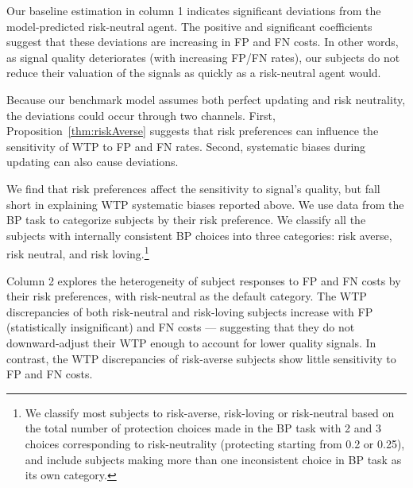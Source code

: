 \documentclass[12pt,a4paper]{article}
\begin{document}
Our baseline estimation in column 1 indicates significant deviations from the model-predicted risk-neutral agent. The positive and significant coefficients suggest that these deviations are increasing in FP and FN costs. In other words, as signal quality deteriorates (with increasing FP/FN rates), our subjects do not reduce their valuation of the signals as quickly as a risk-neutral agent would.

Because our benchmark model assumes both perfect updating and risk neutrality, the deviations could occur through two channels. First, Proposition~\ref{thm:riskAverse} suggests that risk preferences can influence the sensitivity of WTP to FP and FN rates. Second, systematic biases during updating can also cause deviations. 

We find that risk preferences affect the sensitivity to signal's quality, but fall short in explaining WTP systematic biases reported above. We use data from the BP task to categorize subjects by their risk preference. We classify all the subjects with internally consistent BP choices into three categories: risk averse, risk neutral, and risk loving.\footnote{We classify most subjects to risk-averse, risk-loving or risk-neutral based on the total number of protection choices made in the BP task with 2 and 3 choices corresponding to risk-neutrality (protecting starting from 0.2 or 0.25), and include subjects making more than one inconsistent choice in BP task as its own category.} 

Column 2 explores the heterogeneity of subject responses to FP and FN costs by their risk preferences, with risk-neutral as the default category. The WTP discrepancies of both risk-neutral and risk-loving subjects increase with FP (statistically insignificant) and FN costs --- suggesting that they do not downward-adjust their WTP enough to account for lower quality signals. In contrast, the WTP discrepancies of risk-averse subjects show little sensitivity to FP and FN costs.  
\end{document}
